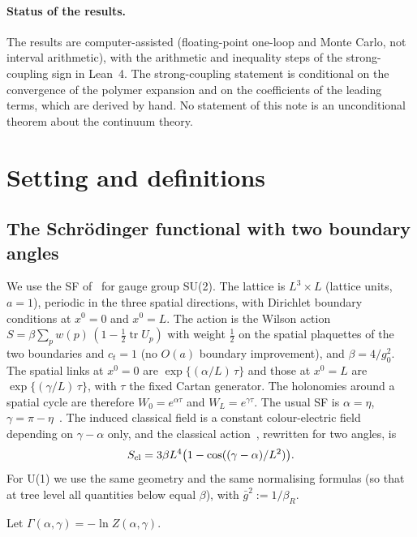 \documentclass[11pt,a4paper]{article}
\theoremstyle{definition}
\theoremstyle{remark}
\newcommand{\gb}{\bar g^{2}}
\newcommand{\bR}{\beta_R}
\begin{document}
\paragraph{Status of the results.} The results are computer-assisted (floating-point one-loop and Monte Carlo, not interval arithmetic), with the arithmetic and inequality steps of the strong-coupling sign in Lean~4. The strong-coupling statement is conditional on the convergence of the polymer expansion and on the coefficients of the leading terms, which are derived by hand. No statement of this note is an unconditional theorem about the continuum theory.

\section{Setting and definitions}\label{sec:setting}

\subsection{The Schrödinger functional with two boundary angles}

We use the SF of~\cite{LNWW,LSWW} for gauge group SU(2). The lattice is $L^3\times L$ (lattice units, $a=1$), periodic in the three spatial directions, with Dirichlet boundary conditions at $x^0=0$ and $x^0=L$. The action is the Wilson action $S=\beta\sum_p w(p)\,(1-\tfrac12\operatorname{tr}U_p)$ with weight $\tfrac12$ on the spatial plaquettes of the two boundaries and $c_t=1$ (no $O(a)$ boundary improvement), and $\beta=4/g_0^2$. The spatial links at $x^0=0$ are $\exp\{(\alpha/L)\,\tau\}$ and those at $x^0=L$ are $\exp\{(\gamma/L)\,\tau\}$, with $\tau$ the fixed Cartan generator. The holonomies around a spatial cycle are therefore $W_0=e^{\alpha\tau}$ and $W_L=e^{\gamma\tau}$. The usual SF is $\alpha=\eta$, $\gamma=\pi-\eta$~\cite[(2.5),(2.6)]{LSWW}. The induced classical field is a constant colour-electric field depending on $\gamma-\alpha$ only, and the classical action~\cite[(2.11)]{LSWW}, rewritten for two angles, is
\begin{equation}\label{eq:Scl}
S_{\rm cl}=3\beta L^4\bigl(1-\cos((\gamma-\alpha)/L^2)\bigr).
\end{equation}
For U(1) we use the same geometry and the same normalising formulas (so that at tree level all quantities below equal $\beta$), with $\gb:=1/\bR$.

Let $\Gamma(\alpha,\gamma)=-\ln Z(\alpha,\gamma)$.
\end{document}
